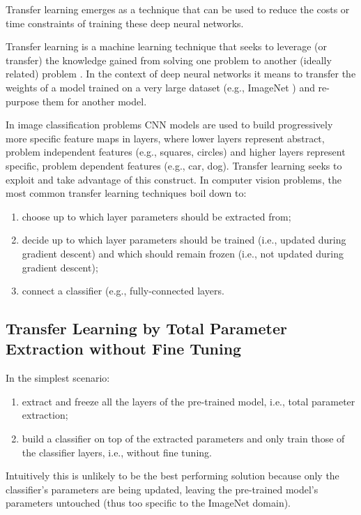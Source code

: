 Transfer learning emerges as a technique that can be used to reduce the costs or time constraints of training these deep neural networks.

Transfer learning is a machine learning technique that seeks to leverage (or transfer) the knowledge gained from solving one problem to another (ideally related) problem \cite{deeptransferlearning}. In the context of deep neural networks it means to transfer the weights of a model trained on a very large dataset (e.g., ImageNet \cite{imagenet}) and re-purpose them for another model.

In image classification problems \ac{CNN} models are used to build progressively more specific feature maps in layers, where lower layers represent abstract, problem independent features (e.g., squares, circles) and higher layers represent specific, problem dependent features (e.g., car, dog). Transfer learning seeks to exploit and take advantage of this construct. In computer vision problems, the most common transfer learning techniques boil down to:

\begin{enumerate}
    \item choose up to which layer parameters should be extracted from;
    \item decide up to which layer parameters should be trained (i.e., updated during gradient descent) and which should remain frozen (i.e., not updated during gradient descent);
    \item connect a classifier (e.g., fully-connected layers.
\end{enumerate}

\subsection{Transfer Learning by Total Parameter Extraction without Fine Tuning}

In the simplest scenario:

\begin{enumerate}
    \item extract and freeze all the layers of the pre-trained model, i.e., total parameter extraction;
    \item build a classifier on top of the extracted parameters and only train those of the classifier layers, i.e., without fine tuning.
\end{enumerate}

Intuitively this is unlikely to be the best performing solution because only the classifier's parameters are being updated, leaving the pre-trained model's parameters untouched (thus too specific to the ImageNet domain).

